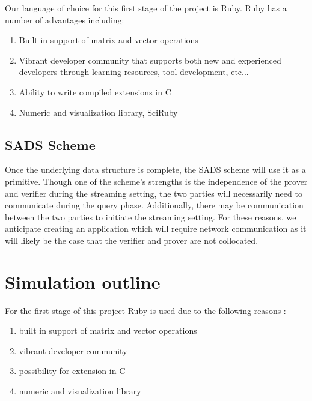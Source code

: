 \documentclass[11pt, letterpaper, oneside]{article}
\begin{document}
	Our language of choice for this first stage of the project is Ruby. Ruby has a number of advantages including:

	\begin{enumerate}
	\item Built-in support of matrix and vector operations
	\item Vibrant developer community that supports both new and experienced developers through learning resources, tool development, etc...
	\item Ability to write compiled extensions in C
	\item Numeric and visualization library, SciRuby
	\end{enumerate}

	\subsection{SADS Scheme}

	Once the underlying data structure is complete, the SADS scheme will use it as a primitive.
	Though one of the scheme's strengths is the independence of the prover and verifier during the streaming setting, the two parties will necessarily need to communicate during the query phase.
	Additionally, there may be communication between the two parties to initiate the streaming setting.
	For these reasons, we anticipate creating an application which will require network communication as it will likely be the case that the verifier and prover are not collocated.


	\section{Simulation outline}
	
	For the first stage of this project Ruby is used due to the following reasons :
	
	\begin{enumerate}
	\item built in support of matrix and vector operations
	\item vibrant developer community
	\item possibility for extension in C
        \item numeric and visualization library
	\end{enumerate}
	
\end{document}
